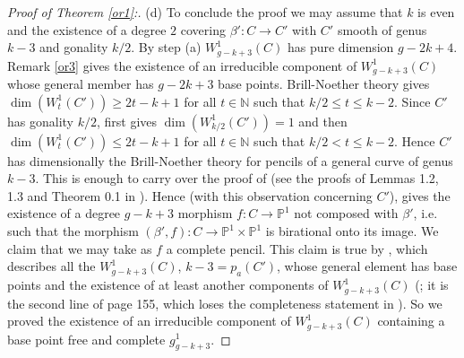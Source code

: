 \documentclass{amsart}
\theoremstyle{plain}
\theoremstyle{definition}
\begin{document}
\begin{proof}[Proof of Theorem \ref{or1}:]
\quad (d) To conclude the proof we may assume that $k$ is even and the existence of a degree $2$ covering $\beta ':C\to C'$ with
$C'$ smooth of genus $k-3$ and gonality $k/2$.  By step (a) $W^1_{g-k+3}({C})$ has pure dimension $g-2k+4$. Remark \ref{or3} gives the existence of an irreducible component
of $W^1_{g-k+3}({C})$ whose general member has $g-2k+3$ base points. Brill-Noether theory gives  $\dim (W^1_t(C'))\ge 2t-k+1$ for all $t\in \mathbb {N}$
such that $k/2 \le t \le k-2$. Since $C'$ has gonality $k/2$, \cite[Theorem 1]{fhl} first gives
$\dim (W^1_{k/2}(C'))=1$ and then $\dim (W^1_t(C'))\le 2t-k+1$ for all $t\in \mathbb {N}$
such that $k/2 < t \le k-2$. Hence $C'$ has dimensionally the Brill-Noether theory for pencils of a general curve of genus $k-3$. This is enough
to carry over the proof of \cite[Theorem 0.1]{bk} (see the proofs of Lemmas 1.2, 1.3 and Theorem 0.1 in \cite{bk}).
Hence (with this observation concerning $C'$), \cite[Theorem 0.1]{bk} gives the existence of a degree $g-k+3$ morphism $f: C\to \mathbb {P}^1$ not composed with $\beta '$,
i.e.
such that the morphism $(\beta ',f): C\to \mathbb {P}^1\times \mathbb {P}^1$ is birational onto its image. We claim that we may take as $f$ a complete pencil.
This claim is true by \cite[Lemma 1.3]{bk}, which describes all the $W^1_{g-k+3}({C})$, $k-3 =p_a(C')$, whose general element has base points
and the existence of at least another components of $W^1_{g-k+3}({C})$ (\cite[first line of page 155]{bk}; it is the second line of page 155, which loses the completeness statement in
\cite[Theorem 0.1]{bk}). So we proved the existence of an irreducible component of $W^1_{g-k+3}({C})$ containing a base point free and complete $g^1_{g-k+3}$.


\end{proof}
\end{document}
